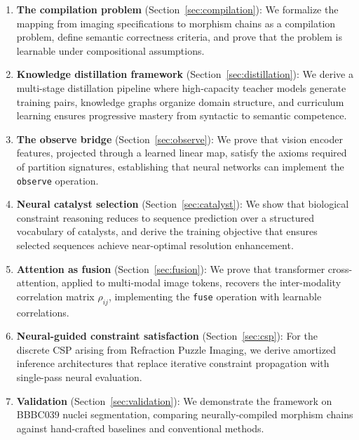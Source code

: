 \documentclass[11pt,twocolumn,a4paper]{article}
\theoremstyle{definition}
\theoremstyle{remark}
\begin{document}
\begin{enumerate}
    \item \textbf{The compilation problem} (Section~\ref{sec:compilation}): We formalize the mapping from imaging specifications to morphism chains as a compilation problem, define semantic correctness criteria, and prove that the problem is learnable under compositional assumptions.

    \item \textbf{Knowledge distillation framework} (Section~\ref{sec:distillation}): We derive a multi-stage distillation pipeline where high-capacity teacher models generate training pairs, knowledge graphs organize domain structure, and curriculum learning ensures progressive mastery from syntactic to semantic competence.

    \item \textbf{The observe bridge} (Section~\ref{sec:observe}): We prove that vision encoder features, projected through a learned linear map, satisfy the axioms required of partition signatures, establishing that neural networks can implement the \texttt{observe} operation.

    \item \textbf{Neural catalyst selection} (Section~\ref{sec:catalyst}): We show that biological constraint reasoning reduces to sequence prediction over a structured vocabulary of catalysts, and derive the training objective that ensures selected sequences achieve near-optimal resolution enhancement.

    \item \textbf{Attention as fusion} (Section~\ref{sec:fusion}): We prove that transformer cross-attention, applied to multi-modal image tokens, recovers the inter-modality correlation matrix $\rho_{ij}$, implementing the \texttt{fuse} operation with learnable correlations.

    \item \textbf{Neural-guided constraint satisfaction} (Section~\ref{sec:csp}): For the discrete CSP arising from Refraction Puzzle Imaging, we derive amortized inference architectures that replace iterative constraint propagation with single-pass neural evaluation.

    \item \textbf{Validation} (Section~\ref{sec:validation}): We demonstrate the framework on BBBC039 nuclei segmentation, comparing neurally-compiled morphism chains against hand-crafted baselines and conventional methods.
\end{enumerate}
\end{document}
